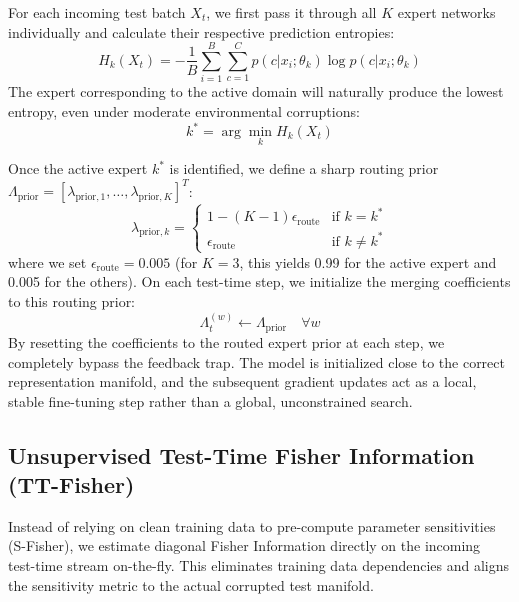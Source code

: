 \documentclass{article}
\theoremstyle{plain}
\theoremstyle{definition}
\theoremstyle{remark}
\begin{document}
For each incoming test batch $X_t$, we first pass it through all $K$ expert networks individually and calculate their respective prediction entropies:
\begin{equation}
H_k(X_t) = -\frac{1}{B} \sum_{i=1}^B \sum_{c=1}^C p(c | x_i; \theta_k) \log p(c | x_i; \theta_k)
\end{equation}
The expert corresponding to the active domain will naturally produce the lowest entropy, even under moderate environmental corruptions:
\begin{equation}
k^* = \arg\min_{k} H_k(X_t)
\end{equation}

Once the active expert $k^*$ is identified, we define a sharp routing prior $\Lambda_{\text{prior}} = [\lambda_{\text{prior}, 1}, \dots, \lambda_{\text{prior}, K}]^T$:
\begin{equation}
\lambda_{\text{prior}, k} = 
\begin{cases} 
1 - (K-1)\epsilon_{\text{route}} & \text{if } k = k^* \\ 
\epsilon_{\text{route}} & \text{if } k \neq k^* 
\end{cases}
\end{equation}
where we set $\epsilon_{\text{route}} = 0.005$ (for $K=3$, this yields 0.99 for the active expert and 0.005 for the others). On each test-time step, we initialize the merging coefficients to this routing prior:
\begin{equation}
\Lambda^{(w)}_t \leftarrow \Lambda_{\text{prior}} \quad \forall w
\end{equation}
By resetting the coefficients to the routed expert prior at each step, we completely bypass the feedback trap. The model is initialized close to the correct representation manifold, and the subsequent gradient updates act as a local, stable fine-tuning step rather than a global, unconstrained search.

\subsection{Unsupervised Test-Time Fisher Information (TT-Fisher)}
Instead of relying on clean training data to pre-compute parameter sensitivities (S-Fisher), we estimate diagonal Fisher Information directly on the incoming test-time stream on-the-fly. This eliminates training data dependencies and aligns the sensitivity metric to the actual corrupted test manifold.
\end{document}
